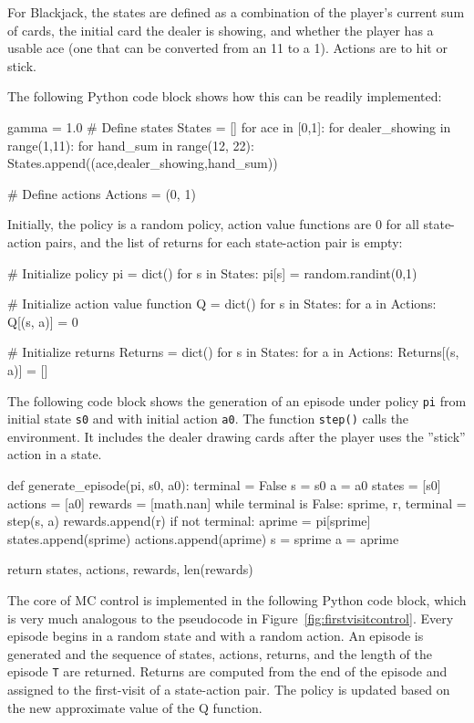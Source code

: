 For Blackjack, the states are defined as a combination of the player's current sum of cards, the initial card the dealer is showing, and whether the player has a usable ace (one that can be converted from an 11 to a 1). Actions are to hit or stick. 
\begin{withcode}
The following Python code block shows how this can be readily implemented:

\begin{pythoncode}
gamma = 1.0
# Define states
States = []
for ace in [0,1]:
    for dealer_showing in range(1,11):
        for hand_sum in range(12, 22):
            States.append((ace,dealer_showing,hand_sum))

# Define actions
Actions = (0, 1)
\end{pythoncode}

Initially, the policy is a random policy, action value functions are 0 for all state-action pairs, and the list of returns for each state-action pair is empty:

\begin{pythoncode}
# Initialize policy
pi = dict()
for s in States:
    pi[s] = random.randint(0,1)

# Initialize action value function
Q = dict()
for s in States:
    for a in Actions:
        Q[(s, a)] = 0

# Initialize returns
Returns = dict()
for s in States:
    for a in Actions:
        Returns[(s, a)] = []
\end{pythoncode}

The following code block shows the generation of an episode under policy \texttt{pi} from initial state \texttt{s0} and with initial action \texttt{a0}. The function \texttt{step()} calls the environment. It includes the dealer drawing cards after the player uses the ''stick'' action in a state. 

\begin{pythoncode}
def generate_episode(pi, s0, a0):
    terminal = False
    s = s0
    a = a0
    states = [s0]
    actions = [a0]
    rewards = [math.nan]
    while terminal is False:
        sprime, r, terminal = step(s, a)
        rewards.append(r)
        if not terminal:
            aprime = pi[sprime]
            states.append(sprime)
            actions.append(aprime)
            s = sprime
            a = aprime

    return states, actions, rewards, len(rewards)
\end{pythoncode}

The core of MC control is implemented in the following Python code block, which is very much analogous to the pseudocode in Figure~\ref{fig:firstvisitcontrol}. Every episode begins in a random state and with a random action. An episode is generated and the sequence of states, actions, returns, and the length of the episode \texttt{T} are returned. Returns are computed from the end of the episode and assigned to the first-visit of a state-action pair. The policy is updated based on the new approximate value of the Q function.


\end{withcode}
